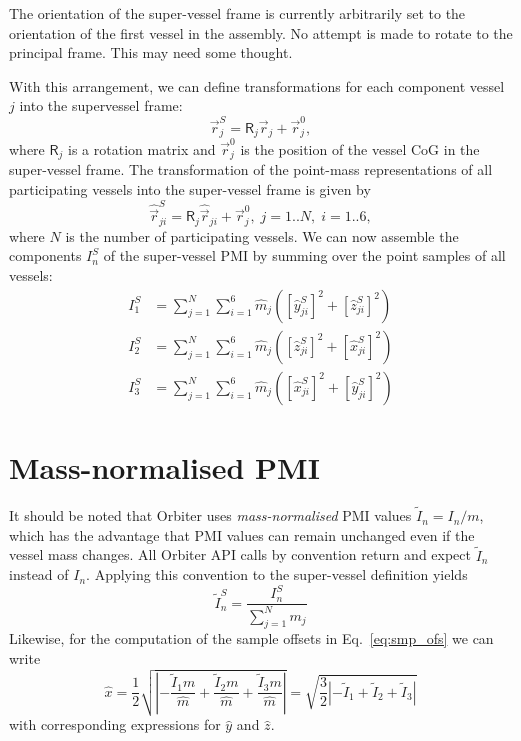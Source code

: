 \documentclass[a4paper]{article}
\newcommand\mat[1]{\mathsf{#1}}
\begin{document}
The orientation of the super-vessel frame is currently arbitrarily set to the orientation of the first vessel in the assembly. No attempt is made to rotate to the principal frame. This may need some thought.

With this arrangement, we can define transformations for each component vessel $j$ into the supervessel frame:
\begin{equation}
  \vec{r}_j^S = \mat{R}_j \vec{r}_j + \vec{r}_j^0,
\end{equation}
where $\mat{R}_j$ is a rotation matrix and $\vec{r}_j^0$ is the position of the vessel CoG in the super-vessel frame.
The transformation of the point-mass representations of all participating vessels into the super-vessel frame is given by
\begin{equation}
\hat{\vec{r}}_{ji}^S = \mat{R}_j \hat{\vec{r}}_{ji} + \vec{r}_j^0, \; j=1..N, \; i=1..6,
\end{equation}
where $N$ is the number of participating vessels.
We can now assemble the components $I_n^S$ of the super-vessel PMI by summing over the point samples of all vessels:
\begin{equation}
\begin{split}
I_1^S & = \sum_{j=1}^N \sum_{i=1}^6 \hat m_j ([\hat y_{ji}^S]^2 + [\hat z_{ji}^S]^2)\\
I_2^S & = \sum_{j=1}^N \sum_{i=1}^6 \hat m_j ([\hat z_{ji}^S]^2 + [\hat x_{ji}^S]^2)\\
I_3^S & = \sum_{j=1}^N \sum_{i=1}^6 \hat m_j ([\hat x_{ji}^S]^2 + [\hat y_{ji}^S]^2)
\end{split}
\end{equation}

\section{Mass-normalised PMI}
It should be noted that Orbiter uses \emph{mass-normalised} PMI values $\tilde I_n = I_n/m$, which has the advantage that PMI values can remain unchanged even if the vessel mass changes. All Orbiter API calls by convention return and expect $\tilde I_n$ instead of $I_n$. Applying this convention to the super-vessel definition yields
\begin{equation}
\tilde{I}_n^S = \frac{I_n^S}{\sum_{j=1}^N m_j}
\end{equation}
Likewise, for the computation of the sample offsets in Eq.~\ref{eq:smp_ofs} we can write
\begin{equation}
  \hat x = \frac{1}{2} \sqrt{\left| -\frac{\tilde{I}_1 m}{\hat m} + \frac{\tilde{I}_2 m}{\hat m} + \frac{\tilde{I}_3 m}{\hat m} \right|} =
  \sqrt{\frac{3}{2} \left| -\tilde{I}_1 + \tilde{I}_2 + \tilde{I}_3 \right|}
\end{equation}
with corresponding expressions for $\hat y$ and $\hat z$.
\end{document}
